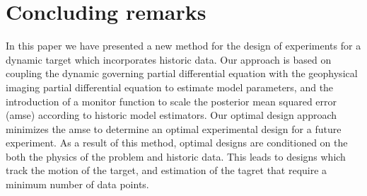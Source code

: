 \documentclass[11pt]{article}
\begin{document}
\section{Concluding remarks}
In this paper we have presented a new method for the design of experiments for a dynamic target which incorporates historic data. Our approach is based on coupling the dynamic governing partial differential equation with the geophysical imaging partial differential equation to estimate model parameters, and the introduction of a monitor function to scale the posterior mean squared error (amse) according to historic model estimators. Our optimal design approach  minimizes the amse to determine an optimal experimental design for a future experiment. 
As a result of this method, optimal designs are conditioned on the both the physics of the problem and historic data. This leads to designs which track the motion of the target, and estimation of the tagret that require a minimum number of data points. 


%
\end{document}
